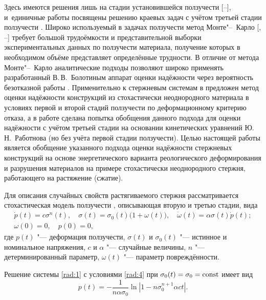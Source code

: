 Здесь имеются решения лишь на стадии установившейся ползучести [--], и~единичные работы посвящены решению краевых задач с учётом третьей  стадии ползучести \cite{rad:bib:14}. Широко используемый  в задачах ползучести метод Монте"--~Карло [, --] требует большой трудоёмкости и представительной выборки экспериментальных данных по ползучести материала, получение которых в необходимом объёме представляет определённые трудности. В отличие от метода Монте"--~Карло аналитические подходы позволяют широко применять разработанный В.\,В.~Болотиным аппарат оценки надёжности через вероятность безотказной работы \cite{rad:bib:2}. Применительно к стержневым системам в \cite{rad:bib:20} предложен метод оценки надёжности конструкций из стохастически неоднородного материала в условиях первой и второй стадий ползучести по деформационному критерию отказа, а в работе \cite{rad:bib:21} сделана попытка обобщения данного подхода для оценки надёжности с учётом третьей стадии на основании кинетических уравнений Ю.\,Н.~Работнова (но без учёта первой стадии ползучести). Целью настоящей работы является обобщение указанного подхода оценки надёжности стержневых конструкций на основе энергетического варианта реологического деформирования и разрушения материалов \cite{rad:bib:22, rad:bib:23} на примере стохастически неоднородного стержня, работающего на растяжение (сжатие).

\smallskip

 Для описания случайных свойств растягиваемого стержня рассматривается стохастическая модель ползучести \cite{rad:bib:22, rad:bib:23}, описывающая вторую и третью стадии, вида
\begin{gather}
\dot{p}(t)=c\sigma^n(t),
\label{rad:1}
\quad 
\sigma(t)=\sigma_0(t)\bigl(1+\omega(t)\bigr),
\quad 
\dot{\omega}(t)=\alpha\sigma(t)\dot{p}(t);
\\
\omega(0)=0, \quad p(0)=0,
\label{rad:4}
\end{gather}
где $p(t)$ "--- деформация ползучести, $\sigma(t)$ и $\sigma_0(t)$ "--- истинное и номинальное напряжения, $c$ и $\alpha$ "--- случайные величины, $n$ "--- детерминированный параметр, $\omega(t)$ "--- параметр повреждённости.

Решение системы \eqref{rad:1} с условиями \eqref{rad:4} при $\sigma_0(t)=\sigma_0={\rm const}$ имеет вид
\begin{equation}
p(t)=-\frac{1}{n\alpha\sigma_0}\ln\left|1-n\sigma_0^{n+1}\alpha ct\right|.
\label{rad:5}
\end{equation}

